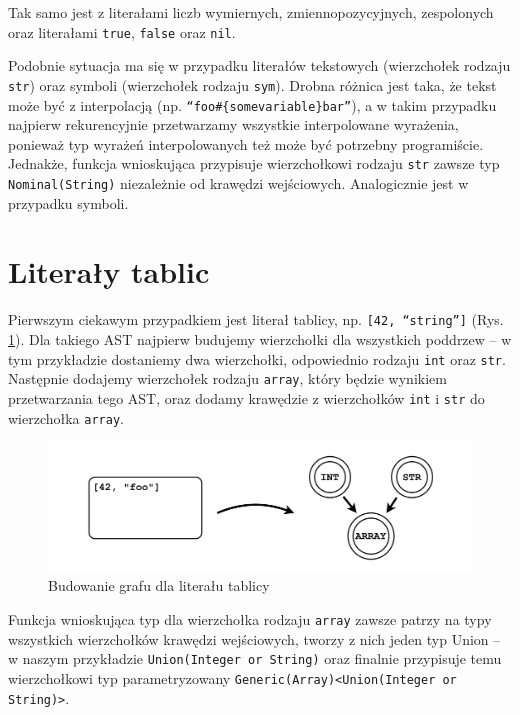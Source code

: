 \documentclass[declaration,shortabstract,mgr]{iithesis}
\begin{document}
Tak samo jest z literałami liczb wymiernych, zmiennopozycyjnych, zespolonych oraz literałami \texttt{true}, \texttt{false} oraz \texttt{nil}.

Podobnie sytuacja ma się w przypadku literałów tekstowych (wierzchołek rodzaju \texttt{str}) oraz symboli (wierzchołek rodzaju \texttt{sym}). Drobna różnica jest taka, że tekst może być z interpolacją (np. \texttt{``foo\#\{somevariable\}bar''}), a w takim przypadku najpierw rekurencyjnie przetwarzamy wszystkie interpolowane wyrażenia, ponieważ typ wyrażeń interpolowanych też może być potrzebny programiście. Jednakże, funkcja wnioskująca przypisuje wierzchołkowi rodzaju \texttt{str} zawsze typ \texttt{Nominal(String)} niezależnie od krawędzi wejściowych. Analogicznie jest w przypadku symboli.

\section{Literały tablic}

Pierwszym ciekawym przypadkiem jest literał tablicy, np. \texttt{[42, ``string'']} (Rys. \ref{fig:graph-array}). Dla takiego AST najpierw budujemy wierzchołki dla wszystkich poddrzew -- w tym przykładzie dostaniemy dwa wierzchołki, odpowiednio rodzaju \texttt{int} oraz \texttt{str}. Następnie dodajemy wierzchołek rodzaju \texttt{array}, który będzie wynikiem przetwarzania tego AST, oraz dodamy krawędzie z wierzchołków \texttt{int} i \texttt{str} do wierzchołka \texttt{array}.

\begin{figure}[htb]
	\centering
	\includegraphics[scale=0.4]{imgs/msc-array.png}
	\caption{Budowanie grafu dla literału tablicy}
	\label{fig:graph-array}
\end{figure}

Funkcja wnioskująca typ dla wierzchołka rodzaju \texttt{array} zawsze patrzy na typy wszystkich wierzchołków krawędzi wejściowych, tworzy z nich jeden typ Union -- w naszym przykładzie \texttt{Union(Integer or String)} oraz finalnie przypisuje temu wierzchołkowi typ parametryzowany \texttt{Generic(Array)<Union(Integer or String)>}.
\end{document}
